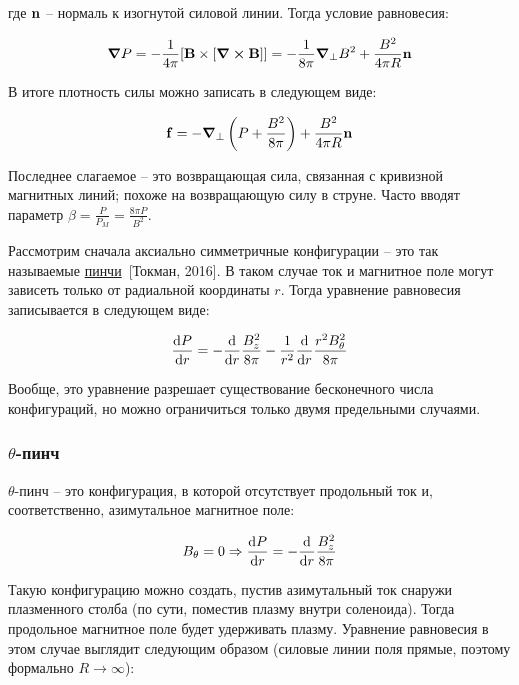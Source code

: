 \documentclass[10pt, a4paper]{article}
\newcommand{\Tokman}{~[Токман, 2016]}
\begin{document}
где $\vb{n}$ -- нормаль к изогнутой силовой линии. Тогда условие равновесия:

\begin{equation*}
	\grad{P} = -\frac{1}{4\pi}[\vb{B}\times[\curl{\vb{B}}]] = 
	-\frac{1}{8\pi}\grad_\perp B^2 + \frac{B^2}{4\pi R}\vb{n}
\end{equation*}

В итоге плотность силы можно записать в следующем виде:

\begin{equation*}
	\vb{f} = -\grad_\perp\left( P + \frac{B^2}{8\pi} \right) + \frac{B^2}{4\pi R}\vb{n}
\end{equation*}

Последнее слагаемое -- это возвращающая сила, связанная с кривизной магнитных линий; похоже на возвращающую силу в струне. Часто вводят параметр $\beta=\frac{P}{P_M}=\frac{8\pi P}{B^2}$.

Рассмотрим сначала аксиально симметричные конфигурации -- это так называемые \uline{пинчи}\Tokman. В таком случае ток и магнитное поле могут зависеть только от радиальной координаты $r$. Тогда уравнение равновесия записывается в следующем виде:

\begin{equation*}
	\dv{P}{r} = -\dv{}{r}\frac{B_z^2}{8\pi} - \frac{1}{r^2}\dv{}{r}\frac{r^2 B_\theta^2}{8\pi}
\end{equation*}

Вообще, это уравнение разрешает существование бесконечного числа конфигураций, но можно ограничиться только двумя предельными случаями.

\subsubsection{$\theta$-пинч}

$\theta$-пинч -- это конфигурация, в которой отсутствует продольный ток и, соответственно, азимутальное магнитное поле:

\begin{equation*}
	B_\theta = 0 \Rightarrow \dv{P}{r} = -\dv{}{r}\frac{B_z^2}{8\pi}
\end{equation*}

Такую конфигурацию можно создать, пустив азимутальный ток снаружи плазменного столба (по сути, поместив плазму внутри соленоида). Тогда продольное магнитное поле будет удерживать плазму. Уравнение равновесия в этом случае выглядит следующим образом (силовые линии поля прямые, поэтому формально $R\rightarrow\infty$):
\end{document}
